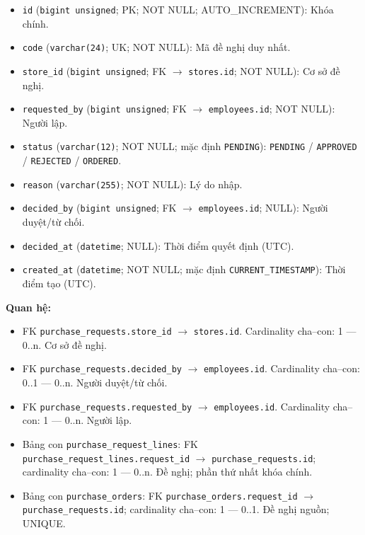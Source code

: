 \begin{itemize}

\item \texttt{id} (\texttt{bigint unsigned}; PK; NOT NULL; AUTO_INCREMENT): Khóa chính.

\item \texttt{code} (\texttt{varchar(24)}; UK; NOT NULL): Mã đề nghị duy nhất.

\item \texttt{store\_id} (\texttt{bigint unsigned}; FK $\rightarrow$ \texttt{stores.id}; NOT NULL): Cơ sở đề nghị.

\item \texttt{requested\_by} (\texttt{bigint unsigned}; FK $\rightarrow$ \texttt{employees.id}; NOT NULL): Người lập.

\item \texttt{status} (\texttt{varchar(12)}; NOT NULL; mặc định \texttt{PENDING}): \texttt{PENDING} / \texttt{APPROVED} / \texttt{REJECTED} / \texttt{ORDERED}.

\item \texttt{reason} (\texttt{varchar(255)}; NOT NULL): Lý do nhập.

\item \texttt{decided\_by} (\texttt{bigint unsigned}; FK $\rightarrow$ \texttt{employees.id}; NULL): Người duyệt/từ chối.

\item \texttt{decided\_at} (\texttt{datetime}; NULL): Thời điểm quyết định (UTC).

\item \texttt{created\_at} (\texttt{datetime}; NOT NULL; mặc định \texttt{CURRENT\_TIMESTAMP}): Thời điểm tạo (UTC).

\end{itemize}

\textbf{Quan hệ:}

\begin{itemize}

\item FK \texttt{purchase\_requests.store\_id} $\rightarrow$ \texttt{stores.id}. Cardinality cha--con: 1 — 0..n. Cơ sở đề nghị.

\item FK \texttt{purchase\_requests.decided\_by} $\rightarrow$ \texttt{employees.id}. Cardinality cha--con: 0..1 — 0..n. Người duyệt/từ chối.

\item FK \texttt{purchase\_requests.requested\_by} $\rightarrow$ \texttt{employees.id}. Cardinality cha--con: 1 — 0..n. Người lập.

\item Bảng con \texttt{purchase\_request\_lines}: FK \texttt{purchase\_request\_lines.request\_id} $\rightarrow$ \texttt{purchase\_requests.id}; cardinality cha--con: 1 — 0..n. Đề nghị; phần thứ nhất khóa chính.

\item Bảng con \texttt{purchase\_orders}: FK \texttt{purchase\_orders.request\_id} $\rightarrow$ \texttt{purchase\_requests.id}; cardinality cha--con: 1 — 0..1. Đề nghị nguồn; UNIQUE.

\end{itemize}

